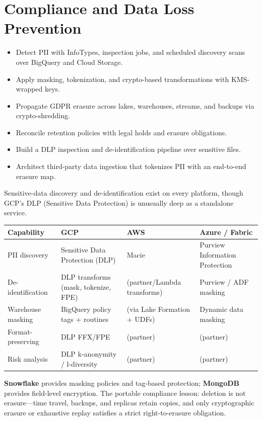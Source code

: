 \chapter{Compliance and Data Loss Prevention}

\begin{objectives}
\begin{itemize}
    \item Detect PII with InfoTypes, inspection jobs, and scheduled discovery scans over BigQuery and Cloud Storage.
    \item Apply masking, tokenization, and crypto-based transformations with KMS-wrapped keys.
    \item Propagate GDPR erasure across lakes, warehouses, streams, and backups via crypto-shredding.
    \item Reconcile retention policies with legal holds and erasure obligations.
    \item Build a DLP inspection and de-identification pipeline over sensitive files.
    \item Architect third-party data ingestion that tokenizes PII with an end-to-end erasure map.
\end{itemize}
\end{objectives}

\begin{crosscloud}
Sensitive-data discovery and de-identification exist on every platform, though GCP's DLP (Sensitive Data Protection) is unusually deep as a standalone service.

\vspace{2mm}
{\footnotesize
\begin{tabular}{@{}p{2.8cm}p{3.0cm}p{3.0cm}p{3.0cm}@{}} \\
\toprule
\textbf{Capability} & \textbf{GCP} & \textbf{AWS} & \textbf{Azure / Fabric} \\
\midrule
PII discovery & Sensitive Data Protection (DLP) & Macie & Purview Information Protection \\
De-identification & DLP transforms (mask, tokenize, FPE) & (partner/Lambda transforms) & Purview / ADF masking \\
Warehouse masking & BigQuery policy tags + routines & (via Lake Formation + UDFs) & Dynamic data masking \\
Format-preserving & DLP FFX/FPE & (partner) & (partner) \\
Risk analysis & DLP k-anonymity / l-diversity & (partner) & (partner) \\
\bottomrule
\end{tabular}}

\vspace{1mm}
\textbf{Snowflake} provides masking policies and tag-based protection; \textbf{MongoDB} provides field-level encryption. The portable compliance lesson: deletion is not erasure---time travel, backups, and replicas retain copies, and only cryptographic erasure or exhaustive replay satisfies a strict right-to-erasure obligation.
\end{crosscloud}

